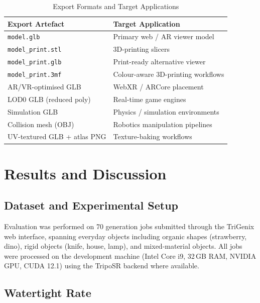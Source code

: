 \documentclass[conference]{IEEEtran}
\begin{document}
\begin{table}[htbp]
\caption{Export Formats and Target Applications}
\label{tab:exports}
\centering
\begin{tabular}{ll}
\toprule
\textbf{Export Artefact} & \textbf{Target Application} \\
\midrule
\texttt{model.glb}               & Primary web / AR viewer model \\
\texttt{model\_print.stl}        & 3D-printing slicers \\
\texttt{model\_print.glb}        & Print-ready alternative viewer \\
\texttt{model\_print.3mf}        & Colour-aware 3D-printing workflows \\
AR/VR-optimised GLB             & WebXR / ARCore placement \\
LOD0 GLB (reduced poly)         & Real-time game engines \\
Simulation GLB                  & Physics / simulation environments \\
Collision mesh (OBJ)             & Robotics manipulation pipelines \\
UV-textured GLB + atlas PNG      & Texture-baking workflows \\
\bottomrule
\end{tabular}
\end{table}

\section{Results and Discussion}

\subsection{Dataset and Experimental Setup}

Evaluation was performed on 70 generation jobs submitted through the TriGenix web interface, spanning everyday
objects including organic shapes (strawberry, dino), rigid objects (knife, house, lamp), and mixed-material objects.
All jobs were processed on the development machine (Intel Core i9, 32\,GB RAM, NVIDIA GPU, CUDA 12.1) using the
TripoSR backend where available.

\subsection{Watertight Rate}
\end{document}
